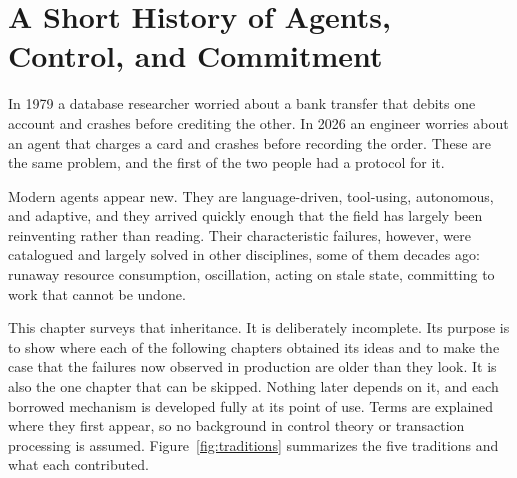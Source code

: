 \documentclass[11pt]{book}
\begin{document}
\chapter{A Short History of Agents, Control, and Commitment}
\label{ch:history}

In 1979 a database researcher worried about a bank transfer that debits one account and crashes before crediting the other. In 2026 an engineer worries about an agent that charges a card and crashes before recording the order. These are the same problem, and the first of the two people had a protocol for it.

Modern agents appear new. They are language-driven, tool-using, autonomous, and adaptive, and they arrived quickly enough that the field has largely been reinventing rather than reading. Their characteristic failures, however, were catalogued and largely solved in other disciplines, some of them decades ago: runaway resource consumption, oscillation, acting on stale state, committing to work that cannot be undone.

This chapter surveys that inheritance. It is deliberately incomplete. Its purpose is to show where each of the following chapters obtained its ideas and to make the case that the failures now observed in production are older than they look. It is also the one chapter that can be skipped. Nothing later depends on it, and each borrowed mechanism is developed fully at its point of use. Terms are explained where they first appear, so no background in control theory or transaction processing is assumed. Figure~\ref{fig:traditions} summarizes the five traditions and what each contributed.
\end{document}
